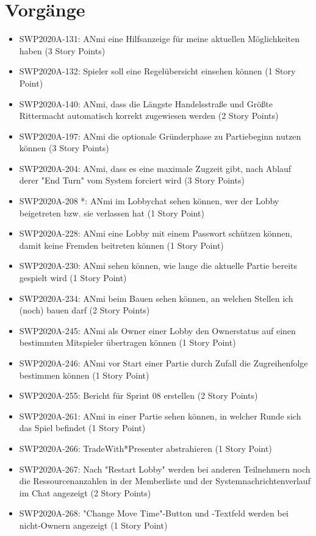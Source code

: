 \documentclass[12pt,a4paper, oneside]{article}
\begin{document}
\section{Vorgänge}
\begin{itemize}
\item SWP2020A-131: ANmi eine Hilfsanzeige für meine aktuellen Möglichkeiten haben (3 Story Points)
\item SWP2020A-132: Spieler soll eine Regelübersicht einsehen können (1 Story Point)
\item SWP2020A-140: ANmi, dass die Längste Handelsstraße und Größte Rittermacht automatisch korrekt zugewiesen werden (2  Story Points)
\item SWP2020A-197: ANmi die optionale Gründerphase zu Partiebeginn nutzen können (3 Story Points)
\item SWP2020A-204: ANmi, dass es eine maximale Zugzeit gibt, nach Ablauf derer "End Turn" vom System forciert wird (3 Story Points)
\item SWP2020A-208 *: ANmi im Lobbychat sehen können, wer der Lobby beigetreten bzw. sie verlassen hat (1 Story Point)
\item SWP2020A-228: ANmi eine Lobby mit einem Passwort schützen können, damit keine Fremden beitreten können (1 Story Point)
\item SWP2020A-230: ANmi sehen können, wie lange die aktuelle Partie bereits gespielt wird (1 Story Point)
\item SWP2020A-234: ANmi beim Bauen sehen können, an welchen Stellen ich (noch) bauen darf (2 Story Points)
\item SWP2020A-245: ANmi als Owner einer Lobby den Ownerstatus auf einen bestimmten Mitspieler übertragen können (1  Story Point)
\item SWP2020A-246:	ANmi vor Start einer Partie durch Zufall die Zugreihenfolge bestimmen können (1 Story Point)
\item SWP2020A-255:	Bericht für Sprint 08 erstellen (2 Story Points)
\item SWP2020A-261:	ANmi in einer Partie sehen können, in welcher Runde sich das Spiel befindet (1 Story Point)
\item SWP2020A-266:	TradeWith*Presenter abstrahieren (1 Story Point)
\item SWP2020A-267:	Nach "Restart Lobby" werden bei anderen Teilnehmern noch die Ressourcenanzahlen in der Memberliste und der Systemnachrichtenverlauf im Chat angezeigt (2 Story Points)
\item SWP2020A-268:	"Change Move Time"-Button und -Textfeld werden bei nicht-Ownern angezeigt (1 Story Point)

\end{itemize}
\end{document}
